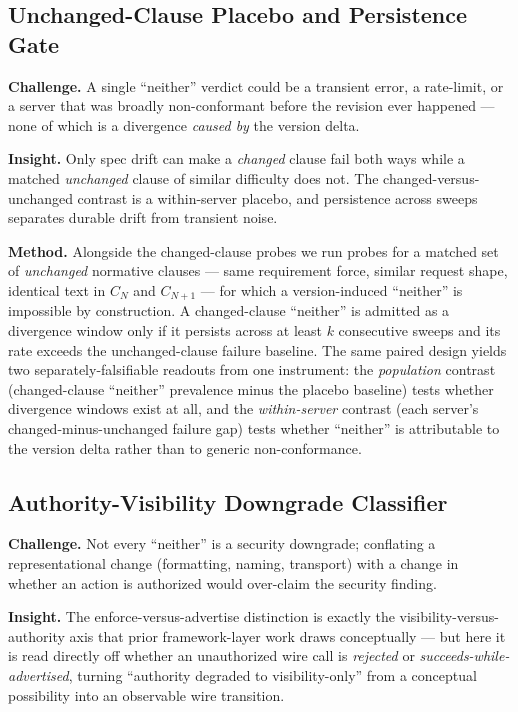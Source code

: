 \documentclass[11pt]{article}
\begin{document}
\subsection{Unchanged-Clause Placebo and Persistence Gate}

\textbf{Challenge.} A single ``neither'' verdict could be a transient error, a rate-limit, or a server that was broadly non-conformant before the revision ever happened --- none of which is a divergence \emph{caused by} the version delta.

\textbf{Insight.} Only spec drift can make a \emph{changed} clause fail both ways while a matched \emph{unchanged} clause of similar difficulty does not. The changed-versus-unchanged contrast is a within-server placebo, and persistence across sweeps separates durable drift from transient noise.

\textbf{Method.} Alongside the changed-clause probes we run probes for a matched set of \emph{unchanged} normative clauses --- same requirement force, similar request shape, identical text in $C_N$ and $C_{N+1}$ --- for which a version-induced ``neither'' is impossible by construction. A changed-clause ``neither'' is admitted as a divergence window only if it persists across at least $k$ consecutive sweeps and its rate exceeds the unchanged-clause failure baseline. The same paired design yields two separately-falsifiable readouts from one instrument: the \emph{population} contrast (changed-clause ``neither'' prevalence minus the placebo baseline) tests whether divergence windows exist at all, and the \emph{within-server} contrast (each server's changed-minus-unchanged failure gap) tests whether ``neither'' is attributable to the version delta rather than to generic non-conformance.

\subsection{Authority-Visibility Downgrade Classifier}

\textbf{Challenge.} Not every ``neither'' is a security downgrade; conflating a representational change (formatting, naming, transport) with a change in whether an action is authorized would over-claim the security finding.

\textbf{Insight.} The enforce-versus-advertise distinction is exactly the visibility-versus-authority axis that prior framework-layer work \citep{capgates, hcp} draws conceptually --- but here it is read directly off whether an unauthorized wire call is \emph{rejected} or \emph{succeeds-while-advertised}, turning ``authority degraded to visibility-only'' from a conceptual possibility into an observable wire transition.
\end{document}
